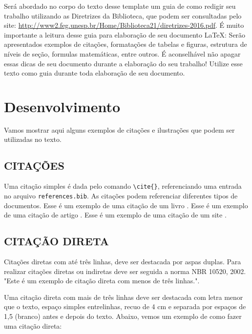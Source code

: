 \documentclass[
  12pt,		%
  a4paper,	%
  openright,%
  oneside,	%
  chapter=TITLE,		%
  section=TITLE,		%
  english,	%
  french,	%
  spanish,	%
  brazil	%
]{abntex2}
\begin{document}
    Será abordado no corpo do texto desse template um guia de como redigir seu trabalho utilizando as Diretrizes da Biblioteca, que podem ser consultadas pelo site: \url{http://www2.feg.unesp.br/Home/Biblioteca21/diretrizes-2016.pdf}. É muito importante a leitura desse guia para elaboração de seu documento \LaTeX: Serão apresentados exemplos de citações, formatações de tabelas e figuras, estrutura de níveis de seção, formulas matemáticas, entre outros. É aconselhável não apagar essas dicas de seu documento durante a elaboração do seu trabalho! Utilize esse texto como guia durante toda elaboração de seu documento.
    
    \chapter{Desenvolvimento}
    
        Vamos mostrar aqui alguns exemplos de citações e ilustrações que podem ser utilizadas no texto.
        
        \section{CITAÇÕES}
    
            Uma citação \cite{carbono} simples é dada pelo comando \verb|\cite{}|, referenciando uma entrada no arquivo \verb|references.bib|. As citações podem referenciar diferentes tipos de documentos. Esse é um exemplo de uma citação de um livro \cite{livro}. Esse é um exemplo de uma citação de artigo \cite{artigo}. Esse é um exemplo de uma citação de um site \cite{website}.
        
        \section{CITAÇÃO DIRETA}
        
            Citações diretas com até três linhas, deve ser destacada por aspas duplas. Para realizar citações diretas ou indiretas deve ser seguida a norma NBR 10520, 2002. "Este é um exemplo de citação direta com menos de três linhas."\cite{artigo}.
    
             Uma citação direta com mais de três linhas deve ser destacada com letra menor que o texto, espaço simples entrelinhas, recuo de 4 cm e separada por espaços de 1,5 (branco) antes e depois do texto. Abaixo, vemos um exemplo de como fazer uma citação direta:
            
\end{document}
